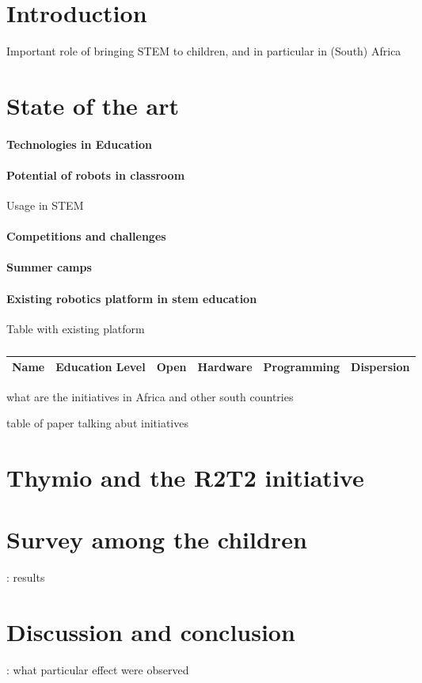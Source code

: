 \documentclass{intech-journal}
\begin{document}
\maketitle

\articleabstract{}
\keywords{}

\section{Introduction}
Important role of bringing STEM to children, and in particular in (South) Africa

\section{State of the art}
\paragraph{Technologies in Education \cite{winthrop2012new}}

\paragraph{Potential of robots in classroom}
Usage in STEM

\paragraph{Competitions and challenges}

\paragraph{Summer camps}

\paragraph{Existing robotics platform in stem education \cite{Karim2015}}
Table with existing platform
\begin{table*}[h]
\begin{tabular}{|c|c|c|c|c|c|} \hline
Name & Education Level & Open & Hardware & Programming & Dispersion \\ \hline

\end{tabular}
\caption{}
\end{table*}

what are the initiatives in Africa and other south countries

table of paper talking abut initiatives


\section{Thymio and the R2T2 initiative}

\section{Survey among the children}: results

\section{Discussion and conclusion}: what particular effect were observed 


{}
\end{document}

